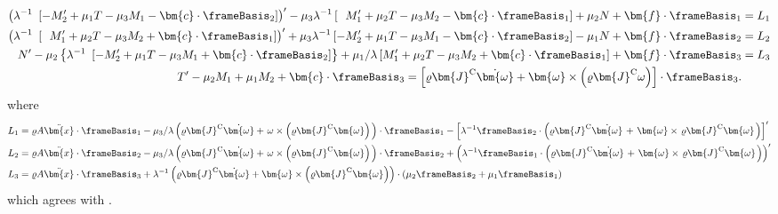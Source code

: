 $$
\begin{aligned}
\left(\lambda^{-1}~\left[
    - M_2'+\mu_1 T-\mu_3 M_1 - \bm{c} \cdot \frameBasis_2
  \right] \right)'
  -\mu_3 \lambda^{-1} \left[
    ~~M_1'+\mu_2 T-\mu_3 M_2 - \bm{c} \cdot \frameBasis_1
  \right]
  +\mu_2 N 
  +\bm{f} \cdot \frameBasis_1
& = L_1 \\
%
\left(\lambda^{-1}~\left[
    ~~M_1'+\mu_2 T-\mu_3 M_2+\bm{c} \cdot \frameBasis_1
  \right] \right)'
  + \mu_3 \lambda^{-1} \left[
    -M_2'+\mu_1 T-\mu_3 M_1 - \bm{c} \cdot \frameBasis_2
  \right]
  - \mu_1 N 
  + \bm{f} \cdot \frameBasis_2 
& = L_2
\\
\begin{aligned}
N'-\mu_2\left\{\lambda^{-1}~\left[
  -M_2'+\mu_1 T-\mu_3 M_1 + \bm{c} \cdot \frameBasis_2
  \right] \right\}
  + \mu_1 / \lambda \left[
  M_1' + \mu_2 T - \mu_3 M_2 + \bm{c} \cdot \frameBasis_1 
  \right]
  +\bm{f} \cdot \frameBasis_3
\end{aligned} 
& = L_3\\
T'-\mu_2 M_1+\mu_1 M_2+\bm{c} \cdot \frameBasis_3
=\left[\varrho \bm{J}^{\mathrm{C}} \dot{\bm{\omega}}+\bm{\omega} \times\left(\varrho \bm{J}^{\mathrm{C}} \omega\right)\right] \cdot \frameBasis_3 .
\end{aligned}
$$
where
$$
\begin{aligned}
L_1 &= \varrho A \ddot{\bm{x}} \cdot \frameBasis_1 
     -\mu_3 / \lambda \left(\varrho \bm{J}^{\mathrm{C}} \dot{\bm{\omega}}
     +\left.\omega \times\left(\varrho \bm{J}^{\mathrm{C}} \bm{\omega}\right)\right. \right) \cdot \frameBasis_1 
     - \left[\lambda^{-1} \frameBasis_2 \cdot\left(\varrho \bm{J}^{\mathrm{C}} \dot{\bm{\omega}}\right. + \left.\bm{\omega} \times\left.\varrho \bm{J}^{\mathrm{C}} \bm{\omega}\right.\right)\right]'  \\
%
L_2 &= \varrho A \ddot{\bm{x}} \cdot \frameBasis_2 
      -\mu_3 / \lambda \left(\varrho \bm{J}^{\mathrm{C}} \dot{\bm{\omega}}
      +\left.\omega \times\left(\varrho \bm{J}^{\mathrm{C}} \bm{\omega}\right)\right. \right)  \cdot \frameBasis_2
     + \left(\lambda^{-1} \frameBasis_1 \cdot\left(\varrho \bm{J}^{\mathrm{C}} \dot{\bm{\omega}}\right. + \left.\bm{\omega} \times\left.\varrho \bm{J}^{\mathrm{C}} \bm{\omega}\right.\right)\right)' \\
L_3 &= \varrho A  \ddot{\bm{x}} \cdot \frameBasis_3+\lambda^{-1}\left(\varrho \bm{J}^{\mathrm{C}} \dot{\bm{\omega}}+ \bm{\omega} \times\left(\varrho \bm{J}^{\mathrm{C}} \bm{\omega}\right)\right) \cdot \left(\mu_2 \frameBasis_2+\mu_1 \frameBasis_1\right)
\end{aligned}
$$
which agrees with \cite{lacarbonara2012nonlinear}.

